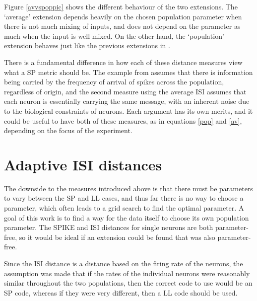 Figure \ref{avvspoppic} shows the different behaviour of the two extensions.  The \lq{}average\rq{} extension depends heavily on the chosen population parameter when there is not much mixing of inputs, and does not depend on the parameter as much when the input is well-mixed.  On the other hand, the \lq{}population\rq{} extension behaves just like the previous extensions in \citep{AronovEtAl2003a, HoughtonSen2008a}.

There is a fundamental difference in how each of these distance measures view what a SP metric should be.  The example from \citep{KreuzEtAl2009a} assumes that there is information being carried by the frequency of arrival of spikes across the population, regardless of origin, and the second measure using the average ISI assumes that each neuron is essentially carrying the same message, with an inherent noise due to the biological constraints of neurons.  Each argument has its own merits, and it could be useful to have both of these measures, as in equations \ref{pop} and \ref{av}, depending on the focus of the experiment.


\newpage
\section{Adaptive ISI distances}

The downside to the measures introduced above is that there must be parameters to vary between the SP and LL cases, and thus far there is no way to choose a parameter, which often leads to a grid search to find the optimal parameter.  A goal of this work is to find a way for the data itself to choose its own population parameter.  The SPIKE and ISI distances for single neurons are both parameter-free, so it would be ideal if an extension could be found that was also parameter-free.

Since the ISI distance is a distance based on the firing rate of the neurons, the assumption was made that if the rates of the individual neurons were reasonably similar throughout the two populations, then the correct code to use would be an SP code, whereas if they were very different, then a LL code should be used.

